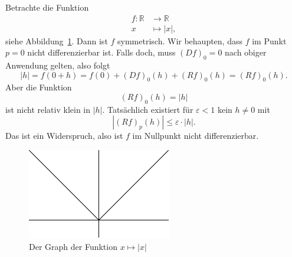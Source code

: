 \documentclass[../main.tex]{subfiles}
\begin{document}
\begin{example}
  Betrachte die Funktion
  \begin{align*}
    f \colon \mathbb{R} & \to \mathbb{R} \\
    x & \mapsto |x|,
  \end{align*}
  siehe Abbildung~\ref{fig:modulus}.
  Dann ist $f$ symmetrisch. Wir behaupten, dass
  $f$ im Punkt $p = 0$ nicht differenzierbar ist.
  Falls doch, muss ${(Df)}_0 = 0$ nach obiger
  Anwendung gelten, also
  folgt
  \[
    |h| = f(0 + h) = f(0) + {(Df)}_0(h) + {(Rf)}_0(h)
    = {(Rf)}_0(h).
  \]
  Aber die Funktion
  \[
    {(Rf)}_0(h) = |h|
  \]
  ist nicht relativ klein in $|h|$. Tatsächlich existiert
  für $\varepsilon < 1$ kein $h \neq 0$ mit
  \[
    |{(Rf)}_p(h)| \leq \varepsilon \cdot |h|.
  \]
  Das ist ein Widerspruch, also ist $f$ im Nullpunkt
  nicht differenzierbar.
\end{example}

\begin{figure}[htb]
  \centering
  \includegraphics{images/modulus}
  \caption{Der Graph der Funktion $x \mapsto |x|$}%
  \label{fig:modulus}
\end{figure}
\end{document}
